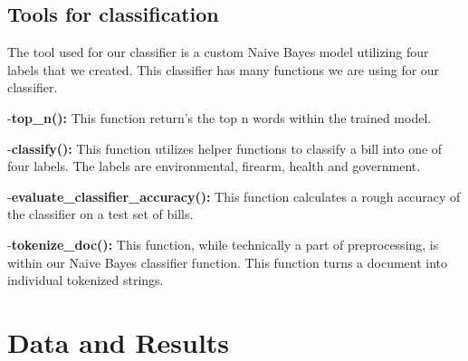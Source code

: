 \documentclass[11pt,a4paper]{article}
\begin{document}
\subsection{Tools for classification}
The tool used for our classifier is a custom Naive Bayes model utilizing four labels that we created. This classifier has many functions we are using for our classifier.

-\textbf{top\_n():} This function return's the top n words within the trained model.

-\textbf{classify():} This function utilizes helper functions to classify a bill into one of four labels. The labels are environmental, firearm, health and government. 

-\textbf{evaluate\_classifier\_accuracy():} This function calculates a rough accuracy of the classifier on a test set of bills.

-\textbf{tokenize\_doc():} This function, while technically a part of preprocessing, is within our Naive Bayes classifier function. This function turns a document into individual tokenized strings.

\section{Data and Results}
\end{document}
